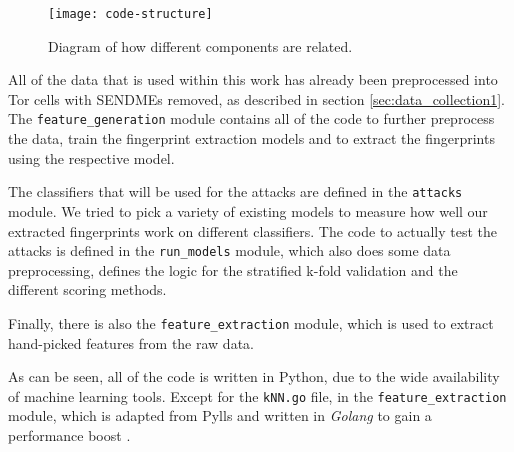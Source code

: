 \begin{figure}[ht]
  \centering
  \texttt{[image: code-structure]}
  \caption{Diagram of how different components are related.}
  \label{fig:code-structure}
\end{figure}

All of the data that is used within this work has already been preprocessed into Tor cells with SENDMEs removed, as described in section \ref{sec:data_collection1}.
The \texttt{feature\_generation} module contains all of the code to further preprocess the data, train the fingerprint extraction models and to extract the fingerprints using the respective model.

The classifiers that will be used for the attacks are defined in the \texttt{attacks} module.
We tried to pick a variety of existing models to measure how well our extracted fingerprints work on different classifiers.
The code to actually test the attacks is defined in the \texttt{run\_models} module, which also does some data preprocessing, defines the logic for the stratified k-fold validation and the different scoring methods.

\newpage

Finally, there is also the \texttt{feature\_extraction} module, which is used to extract hand-picked features from the raw data.

As can be seen, all of the code is written in Python, due to the wide availability of machine learning tools.
Except for the \texttt{kNN.go} file, in the \texttt{feature\_extraction} module, which is adapted from Pylls and written in \textit{Golang} to gain a performance boost \cite{gokNN}.
